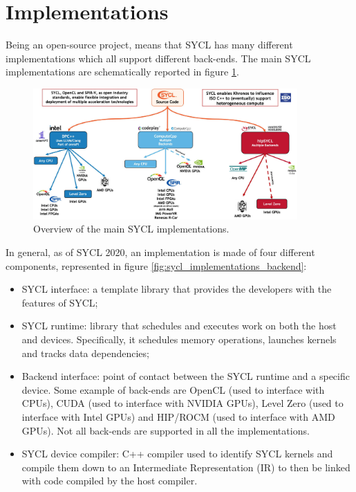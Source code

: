 \section{Implementations}
\label{ch:sycl_implementations}
Being an open-source project, means that SYCL has many different implementations which all support different back-ends. The main SYCL implementations are schematically reported in figure \ref{fig:sycl_implementations}.

\begin{figure}[H]
    \centering
    \includegraphics[width=0.9\textwidth]{media/sycl_implementations.jpg}
    \caption{Overview of the main SYCL implementations.}
    \label{fig:sycl_implementations}
\end{figure}

In general, as of SYCL 2020, an implementation is made of four different components, represented in figure \ref{fig:sycl_implementations_backend}: 
\begin{itemize}
    \item SYCL interface: a template library that provides the developers with the features of SYCL; 
    \item SYCL runtime: library that schedules and executes work on both the host and devices. Specifically, it schedules memory operations, launches kernels and tracks data dependencies;
    \item Backend interface: point of contact between the SYCL runtime and a specific device. Some example of back-ends are OpenCL (used to interface with CPUs), CUDA (used to interface with NVIDIA GPUs), Level Zero (used to interface with Intel GPUs) and HIP/ROCM (used to interface with AMD GPUs). Not all back-ends are supported in all the implementations. 
    \item SYCL device compiler: C++ compiler used to identify SYCL kernels and compile them down to an Intermediate Representation (IR) to then be linked with code compiled by the host compiler.
\end{itemize}

